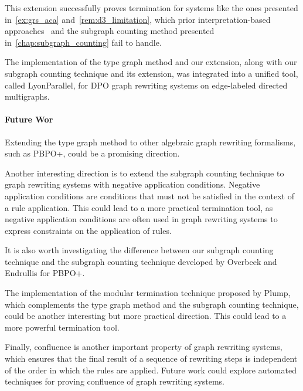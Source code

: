 \documentclass{report}
\begin{document}
This extension successfully proves termination for systems like the ones presented 
in~\autoref{ex:grs_aca} and~\autoref{rem:d3_limitation}, which prior interpretation-based approaches~\cite{zantema2014termination,bruggink2014termination,bruggink2015proving,endrullis2024generalized_arxiv_v2,overbeek2024termination_lmcs} and the subgraph counting method presented in~\autoref{chap:subgraph_counting} fail to handle. 

The implementation of the type graph method and our extension, along with our subgraph counting technique and its extension, was integrated into a unified tool, called LyonParallel, for DPO graph rewriting systems on edge-labeled directed multigraphs.
 
\paragraph{Future Wor}

Extending the type graph method to other algebraic graph rewriting formalisms, such as PBPO+, could be a promising direction.

Another interesting direction is to extend the subgraph counting technique to graph rewriting systems with negative application conditions. Negative application conditions are conditions that must not be satisfied in the context of a rule application. This could lead to a more practical termination tool, as negative application conditions are often used in graph rewriting systems to express constraints on the application of rules.

It is also worth investigating the difference between our subgraph counting technique and
 the subgraph counting technique developed by Overbeek and Endrullis for PBPO+. 

The implementation of the modular termination technique proposed by Plump, which complements the type graph method and the subgraph counting technique, could be another interesting but more practical direction. This could lead to a more powerful termination tool.

Finally, confluence is another important property of graph rewriting systems, which ensures that the final result of a sequence of rewriting steps is independent of the order in which the rules are applied. Future work could explore automated techniques for proving confluence of graph rewriting systems.
\end{document}
